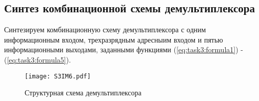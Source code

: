 \subsection{Синтез комбинационной схемы демультиплексора}

Синтезируем комбинационную схему демультиплексора
с одним информационным входом, трехразрядным адресныим входом
и пятью информационными выходами, заданными функциями (\ref{eq:task3:formula1}) - (\ref{eq:task3:formula5}).

\begin{figure}[ht]
    \centering
    \texttt{[image: S3IM6.pdf]}  
    \caption{Структурная схема демультиплексора}
    \label{fig:task3:scheme}
\end{figure}